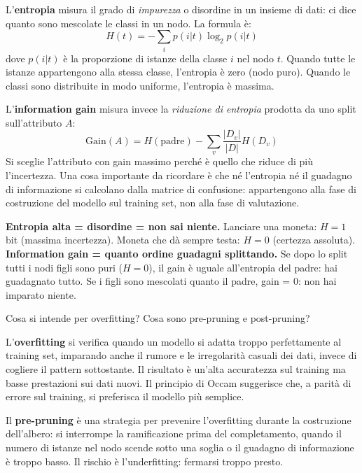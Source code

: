 \documentclass[12pt,a4paper]{article}
\begin{document}
L'\textbf{entropia} misura il grado di \emph{impurezza} o disordine in un insieme di dati: ci dice quanto sono mescolate le classi in un nodo. La formula è:
\[
H(t) = -\sum_{i} p(i|t) \log_2 p(i|t)
\]
dove $p(i|t)$ è la proporzione di istanze della classe $i$ nel nodo $t$. Quando tutte le istanze appartengono alla stessa classe, l'entropia è zero (nodo puro). Quando le classi sono distribuite in modo uniforme, l'entropia è massima.

L'\textbf{information gain} misura invece la \emph{riduzione di entropia} prodotta da uno split sull'attributo $A$:
\[
\text{Gain}(A) = H(\text{padre}) - \sum_{v} \frac{|D_v|}{|D|} H(D_v)
\]
Si sceglie l'attributo con gain massimo perché è quello che riduce di più l'incertezza. Una cosa importante da ricordare è che né l'entropia né il guadagno di informazione si calcolano dalla matrice di confusione: appartengono alla fase di costruzione del modello sul training set, non alla fase di valutazione.

\begin{ricordabox}
\textbf{Entropia alta = disordine = non sai niente.} Lanciare una moneta: $H = 1$ bit (massima incertezza). Moneta che dà sempre testa: $H = 0$ (certezza assoluta).\\[3pt]
\textbf{Information gain = quanto ordine guadagni splittando.} Se dopo lo split tutti i nodi figli sono puri ($H=0$), il gain è uguale all'entropia del padre: hai guadagnato tutto. Se i figli sono mescolati quanto il padre, gain = 0: non hai imparato niente.
\end{ricordabox}

\begin{domandabox}{Cosa si intende per overfitting? Cosa sono pre-pruning e post-pruning?}
\end{domandabox}

L'\textbf{overfitting} si verifica quando un modello si adatta troppo perfettamente al training set, imparando anche il rumore e le irregolarità casuali dei dati, invece di cogliere il pattern sottostante. Il risultato è un'alta accuratezza sul training ma basse prestazioni sui dati nuovi. Il principio di Occam suggerisce che, a parità di errore sul training, si preferisca il modello più semplice.

Il \textbf{pre-pruning} è una strategia per prevenire l'overfitting durante la costruzione dell'albero: si interrompe la ramificazione prima del completamento, quando il numero di istanze nel nodo scende sotto una soglia o il guadagno di informazione è troppo basso. Il rischio è l'underfitting: fermarsi troppo presto.
\end{document}
